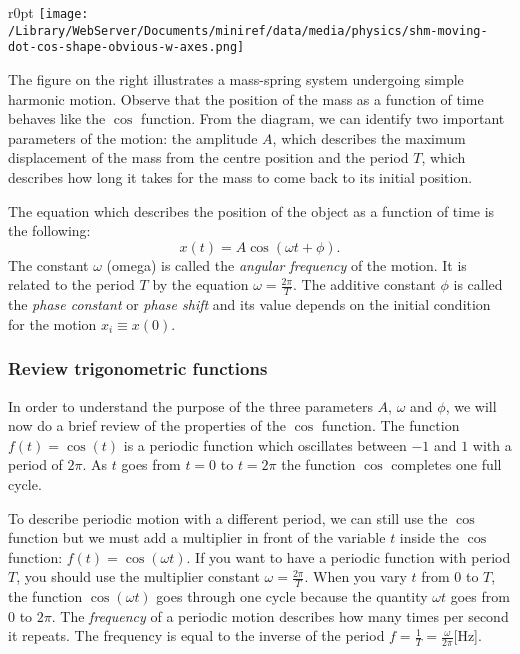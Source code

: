 \documentclass[letterpaper,9pt,journal]{IEEEtran}
\newcommand{\be}{\begin{equation}}
\newcommand{\ee}{\end{equation}}
\begin{document}

\begin{wrapfigure}{r}{0pt}
\texttt{[image: /Library/WebServer/Documents/miniref/data/media/physics/shm-moving-dot-cos-shape-obvious-w-axes.png]}
\end{wrapfigure}

\noindent
The figure on the right illustrates a mass-spring system undergoing simple harmonic motion. 
Observe that the position of the mass as a function of time behaves like the $\cos$ function. 
From the diagram, we can identify two important parameters of the motion:  the amplitude $A$, 
which describes the maximum displacement of the mass from the centre position
and the period $T$, which describes how long it takes for the mass to come back to its initial position.

The equation which describes the position of the object as a function of time is the following:  
\be
 x(t)=A\cos(\omega t   + \phi).
 \label{SHM-x}
\ee
The constant $\omega$ (omega) is called the \emph{angular frequency} of the motion.
It is related to the period $T$ by the equation $\omega = \frac{2\pi}{T}$.
The additive constant $\phi$ is called the \emph{phase constant} or \emph{phase shift}
and its value depends on the initial condition for the motion $x_i\equiv x(0)$.

\subsubsection{Review trigonometric functions}
In order to understand the purpose of the three parameters $A$, $\omega$ and $\phi$,
we will now do a brief review of the properties of the $\cos$ function.
%
The function %
$f(t)=\cos(t)$ is a periodic function which oscillates between $-1$ and $1$ with a period of $2\pi$.
As $t$ goes from $t=0$ to $t=2\pi$ the function $\cos$ completes one full cycle.

To describe periodic motion with a different period, 
we can still use the $\cos$ function but we must add 
a multiplier in front of the variable $t$ inside the $\cos$ function: 
$f(t) = \cos(\omega t )$.
%
If you want to have a periodic function with period $T$,
you should use the multiplier constant $\omega = \frac{2\pi}{T}$.
When you vary $t$ from $0$ to $T$, the function $\cos(\omega t )$
goes through one cycle because the quantity $\omega t$ goes from $0$ to $2\pi$.
The \emph{frequency} of a periodic motion describes how many times per second it repeats. 
The frequency is equal to the inverse of the period $f=\frac{1}{T}=\frac{\omega}{2\pi}$[Hz].
\end{document}
